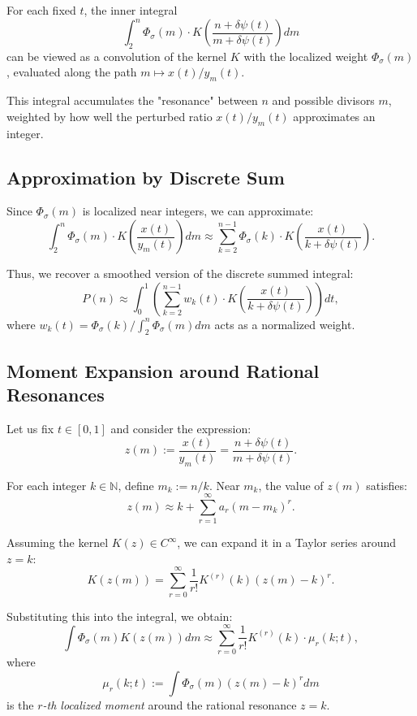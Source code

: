\documentclass[12pt]{article}
\theoremstyle{definition}
\theoremstyle{plain}
\theoremstyle{remark}
\begin{document}
For each fixed \( t \), the inner integral
\[
\int_2^n \Phi_\sigma(m) \cdot K\left( \frac{n + \delta \psi(t)}{m + \delta \psi(t)} \right) dm
\]
can be viewed as a convolution of the kernel \( K \) with the localized weight \( \Phi_\sigma(m) \), evaluated along the path \( m \mapsto x(t)/y_m(t) \). 

This integral accumulates the "resonance" between \( n \) and possible divisors \( m \), weighted by how well the perturbed ratio \( x(t)/y_m(t) \) approximates an integer.

\subsection{Approximation by Discrete Sum}

Since \( \Phi_\sigma(m) \) is localized near integers, we can approximate:
\[
\int_2^n \Phi_\sigma(m) \cdot K\left( \frac{x(t)}{y_m(t)} \right) dm \approx \sum_{k=2}^{n-1} \Phi_\sigma(k) \cdot K\left( \frac{x(t)}{k + \delta \psi(t)} \right).
\]

Thus, we recover a smoothed version of the discrete summed integral:
\[
P(n) \approx \int_0^1 \left( \sum_{k=2}^{n-1} w_k(t) \cdot K\left( \frac{x(t)}{k + \delta \psi(t)} \right) \right) dt,
\]
where \( w_k(t) = \Phi_\sigma(k) / \int_2^n \Phi_\sigma(m) dm \) acts as a normalized weight.

\subsection{Moment Expansion around Rational Resonances}

Let us fix \( t \in [0,1] \) and consider the expression:
\[
z(m) := \frac{x(t)}{y_m(t)} = \frac{n + \delta \psi(t)}{m + \delta \psi(t)}.
\]

For each integer \( k \in \mathbb{N} \), define \( m_k := n/k \). Near \( m_k \), the value of \( z(m) \) satisfies:
\[
z(m) \approx k + \sum_{r=1}^\infty a_r(m - m_k)^r.
\]

Assuming the kernel \( K(z) \in C^\infty \), we can expand it in a Taylor series around \( z = k \):
\[
K(z(m)) = \sum_{r=0}^\infty \frac{1}{r!} K^{(r)}(k) (z(m) - k)^r.
\]

Substituting this into the integral, we obtain:
\[
\int \Phi_\sigma(m) K(z(m)) dm \approx \sum_{r=0}^\infty \frac{1}{r!} K^{(r)}(k) \cdot \mu_r(k; t),
\]
where
\[
\mu_r(k; t) := \int \Phi_\sigma(m) (z(m) - k)^r dm
\]
is the \emph{\( r \)-th localized moment} around the rational resonance \( z = k \).
\end{document}
